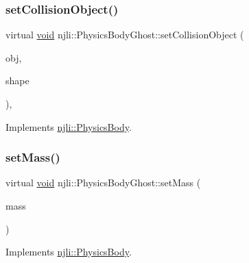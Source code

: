 \subsubsection{\texorpdfstring{set\+Collision\+Object()}{setCollisionObject()}}
{\footnotesize\ttfamily virtual \mbox{\hyperlink{_thread_8h_af1e856da2e658414cb2456cb6f7ebc66}{void}} njli\+::\+Physics\+Body\+Ghost\+::set\+Collision\+Object (\begin{DoxyParamCaption}\item[{const bt\+Collision\+Object \&}]{obj,  }\item[{\mbox{\hyperlink{classnjli_1_1_physics_shape}{Physics\+Shape}} $\ast$}]{shape }\end{DoxyParamCaption})\hspace{0.3cm}{\ttfamily [protected]}, {\ttfamily [virtual]}}



Implements \mbox{\hyperlink{classnjli_1_1_physics_body_a674974f0df3db645620c7156177659ee}{njli\+::\+Physics\+Body}}.

\mbox{\label{classnjli_1_1_physics_body_ghost_a1edc30655aa0495dbf60c59138cb52e2}} 
\subsubsection{\texorpdfstring{set\+Mass()}{setMass()}}
{\footnotesize\ttfamily virtual \mbox{\hyperlink{_thread_8h_af1e856da2e658414cb2456cb6f7ebc66}{void}} njli\+::\+Physics\+Body\+Ghost\+::set\+Mass (\begin{DoxyParamCaption}\item[{\mbox{\hyperlink{_util_8h_a5f6906312a689f27d70e9d086649d3fd}{f32}}}]{mass }\end{DoxyParamCaption})\hspace{0.3cm}{\ttfamily [virtual]}}



Implements \mbox{\hyperlink{classnjli_1_1_physics_body_a2418ec20e73cfe304bac23e306daebcd}{njli\+::\+Physics\+Body}}.

\mbox{\label{classnjli_1_1_physics_body_ghost_aa6f6ca168453f49b48d295a1bb8d7228}} 
